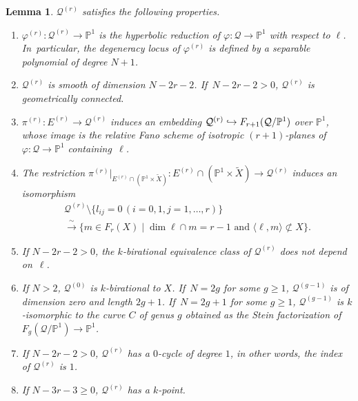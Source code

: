 \documentclass[JEP,XML,SOM,Unicode,NoEqCountersInSection,published]{cedram}
\newcommand\hto{\mathrel{\lhook\joinrel\to}}
\theoremstyle{plain}
\newtheorem{lem}[thm]{Lemma}
\theoremstyle{definition}
\let\phi\varphi
\renewcommand\P{\mathbb{P}}
\begin{document}
\begin{lem}\label{lem:hyperbolic-reduction}
$\mathcal{Q}^{(r)}$ satisfies the following properties.
\begin{enumerate}
\item\label{item:hyperbolic-reduction-pencil} $\phi^{(r)}\colon\mathcal{Q}^{(r)}\to \P^1$
is the hyperbolic reduction of $\phi\colon \mathcal{Q}\to \P^1$ with respect to $\ell$. In~particular, the degeneracy locus of $\phi^{(r)}$ is defined by a separable polynomial of degree $N+1$.
\item\label{item:hyperbolic-reduction-smooth} $\mathcal{Q}^{(r)}$ is smooth of dimension $N-2r-2$. If~$N-2r-2>0$, $\mathcal{Q}^{(r)}$ is geometrically connected.
\item\label{item:hyperbolic-reduction-embedding} $\pi^{(r)}\colon E^{(r)}\to \mathcal{Q}^{(r)}$ induces an embedding $\mathcal{Q}^{(r)}\hto F_{r+1}(\mathcal{Q}/\P^1)$ over $\P^1$,
whose image is the relative Fano
scheme of isotropic $(r+1)$-planes
of
$\phi\colon \mathcal{Q}\to \P^1$
containing~$\ell$.
\item\label{item:hyperbolic-reduction-image}
The restriction
$\pi^{(r)}|_{E^{(r)}\cap (\P^1\times \widetilde{X})}\colon E^{(r)}\cap (\P^1\times \widetilde{X})\to \mathcal{Q}^{(r)}$ induces an isomorphism\vspace*{-5pt}
\begin{multline*}
\mathcal{Q}^{(r)}\setminus\bigl\{l_{ij} = 0 \, (i= 0,1, j=1,\dots, r)\bigr\}\\
\xrightarrow{\,\sim\,} \bigl\{m\in F_r(X)\mid \dim \ell\cap m = r-1 \text{ and }\langle \ell,m\rangle \not\subset X\bigr\}.
\end{multline*}
\item\label{item:hyperbolic-reduction-independence}
If $N\!-\!2r\!-\!2\!>\!0$, the $k$\nobreakdash-birational equivalence class of $\mathcal{Q}^{(r)}$
does not depend on~$\ell$.
\item\label{item:hyperbolic-reduction-max-min} If $N>2$, $\mathcal{Q}^{(0)}$ is $k$\nobreakdash-birational to $X$. If~$N=2g$ for some $g\geq 1$, $\mathcal{Q}^{(g-1)}$ is of dimension zero and length $2g+1$. If~$N=2g+1$ for some $g\geq 1$, $\mathcal{Q}^{(g-1)}$ is $k$\nobreakdash-isomorphic to the curve $C$ of genus $g$ obtained as the Stein factorization of $F_{g}(\mathcal{Q}/\P^1)\to \P^1$.
\item\label{item:index}
If $N-2r-2>0$, $\mathcal{Q}^{(r)}$ has a $0$-cycle of degree $1$,
in other words, the index of $\mathcal{Q}^{(r)}$ is $1$.
\item\label{item:rationalpoint}
If $N-3r-3\geq 0$, $\mathcal{Q}^{(r)}$ has a $k$\nobreakdash-point.
\end{enumerate}
\end{lem}
\end{document}
